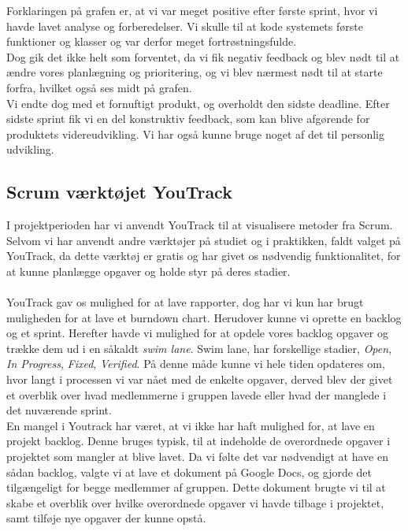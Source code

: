 \noindent
Forklaringen på grafen er, at vi var meget positive efter første sprint, hvor vi havde lavet analyse og forberedelser.
Vi skulle til at kode systemets første funktioner og klasser og var derfor meget fortrøstningsfulde.
\\
Dog gik det ikke helt som forventet, da vi fik negativ feedback og blev nødt til at ændre vores planlægning og prioritering,
og vi blev nærmest nødt til at starte forfra, hvilket også ses midt på grafen.
\\
Vi endte dog med et fornuftigt produkt, og overholdt den sidste deadline. Efter sidste sprint fik vi en del konstruktiv feedback, 
som kan blive afgørende for produktets videreudvikling. Vi har også kunne bruge noget af det til personlig udvikling.

\subsection{Scrum værktøjet YouTrack}
I projektperioden har vi anvendt YouTrack til at visualisere metoder fra Scrum.
\\
Selvom vi har anvendt andre værktøjer på studiet og i praktikken, faldt valget på YouTrack, da dette værktøj er gratis og
har givet os nødvendig funktionalitet, for at kunne planlægge opgaver og holde styr på deres stadier.
\\\\
YouTrack gav os mulighed for at lave rapporter, dog har vi kun har brugt muligheden for at lave et burndown chart. Herudover kunne vi oprette
en backlog og et sprint. Herefter havde vi mulighed for at opdele vores backlog opgaver og trække dem ud i en såkaldt \textit{swim lane}.
Swim lane, har forskellige stadier, \textit{Open}, \textit{In Progress}, \textit{Fixed}, \textit{Verified}. På denne måde kunne vi hele tiden opdateres om, hvor langt i processen vi var nået med de enkelte opgaver, derved blev der givet et overblik over hvad medlemmerne i gruppen lavede eller hvad der manglede i det nuværende sprint.
\\
En mangel i Youtrack har været, at vi ikke har haft mulighed for, at lave en projekt backlog. Denne bruges typisk, til at indeholde de overordnede opgaver i projektet som mangler at blive lavet.
Da vi følte det var nødvendigt at have en sådan backlog, valgte vi at lave et dokument på Google Docs, og gjorde det tilgængeligt for begge medlemmer af gruppen.
Dette dokument brugte vi til at skabe et overblik over hvilke overordnede opgaver vi havde tilbage i projektet, samt tilføje nye opgaver der kunne opstå.
